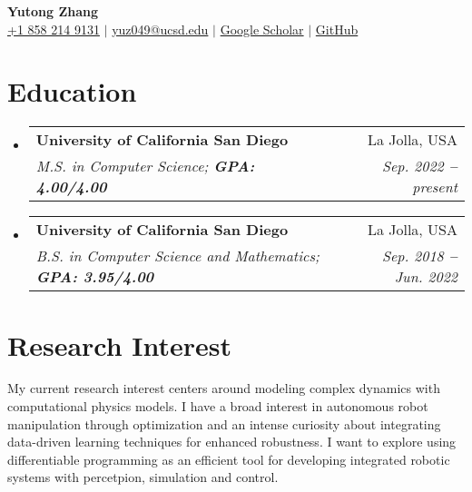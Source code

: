 \documentclass[letterpaper,11pt]{article}
\makeatletter
\newcommand{\resumeEducationHeading}[4]{
    \vspace{-2pt}\item
    \begin{tabular*}{0.97\textwidth}[t]{l@{\extracolsep{\fill}}r}
        \textbf{#1} & #2 \\
        \textit{\small #3} & \textit{\small #4}
    \end{tabular*}\vspace{-7pt}
}
\newcommand{\resumeSubHeadingListStart}{\begin{itemize}[leftmargin=0in, label={}]}
\newcommand{\resumeSubHeadingListEnd}{\end{itemize}}
\makeatother
\begin{document}

\begin{center}
    \textbf{\Huge Yutong Zhang} \\ \vspace{3pt}
    \small
    \faMobile \hspace{.5pt} \href{tel:18582149131}{+1 858 214 9131}
    $|$
    \faEnvelope \hspace{.5pt} \href{mailto:yuz049@ucsd.edu}{yuz049@ucsd.edu}
    $|$
    \faGraduationCap \hspace{.5pt} \href{https://scholar.google.com/citations?user=wuaUYbYAAAAJ&hI}{Google Scholar}
    $|$
    \faGithub \hspace{.5pt} \href{https://github.com/TonyZYT2000}{GitHub}
\end{center}




\section{Education}
    \vspace{3pt}
    \resumeSubHeadingListStart
        \resumeEducationHeading
            {University of California San Diego}
            {La Jolla, USA}
            {M.S. in Computer Science; \textbf{GPA: 4.00/4.00}}
            {Sep. 2022 \textbf{--} present}
        \resumeEducationHeading
            {University of California San Diego}
            {La Jolla, USA}
            {B.S. in Computer Science and Mathematics; \textbf{GPA: 3.95/4.00}}
            {Sep. 2018 \textbf{--} Jun. 2022}
    \resumeSubHeadingListEnd



\section{Research Interest}
    \vspace{3pt}
    My current research interest centers around modeling complex dynamics with computational physics models.
    I have a broad interest in autonomous robot manipulation through optimization and an intense curiosity about integrating data-driven learning techniques for enhanced robustness.
    I want to explore using differentiable programming as an efficient tool for developing integrated robotic systems with percetpion, simulation and control.
\end{document}
